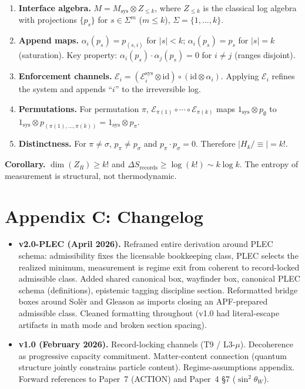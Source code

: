 \documentclass[11pt]{article}
\begin{document}
\begin{enumerate}[leftmargin=1.6em]
    \item \textbf{Interface algebra.} $M = M_{\mathrm{sys}} \otimes Z_{\le k}$,
    where $Z_{\le k}$ is the classical log algebra with projections $\{p_s\}$ for
    $s \in \Sigma^m$ ($m \le k$), $\Sigma = \{1,\ldots,k\}$.
    \item \textbf{Append maps.} $\alpha_i(p_s) = p_{(s,i)}$ for $\lvert s\rvert <
    k$; $\alpha_i(p_s) = p_s$ for $\lvert s\rvert = k$ (saturation). Key property:
    $\alpha_i(p_s) \cdot \alpha_j(p_s) = 0$ for $i \neq j$ (ranges disjoint).
    \item \textbf{Enforcement channels.} $\mathcal{E}_i = (\mathcal{E}_i^{\mathrm{sys}}
    \otimes \mathrm{id}) \circ (\mathrm{id} \otimes \alpha_i)$. Applying
    $\mathcal{E}_i$ refines the system and appends ``$i$'' to the irreversible log.
    \item \textbf{Permutations.} For permutation $\pi$,
    $\mathcal{E}_{\pi(1)} \circ \cdots \circ \mathcal{E}_{\pi(k)}$ maps
    $1_{\mathrm{sys}} \otimes p_{\emptyset}$ to
    $1_{\mathrm{sys}} \otimes p_{(\pi(1),\ldots,\pi(k))} = 1_{\mathrm{sys}} \otimes p_{\pi}$.
    \item \textbf{Distinctness.} For $\pi \neq \sigma$, $p_{\pi} \neq p_{\sigma}$
    and $p_{\pi} \cdot p_{\sigma} = 0$. Therefore $\lvert H_k / \equiv \rvert = k!$.
\end{enumerate}

\textbf{Corollary.} $\dim(Z_R) \ge k!$ and $\Delta S_{\mathrm{records}} \ge \log(k!)
\sim k\log k$. The entropy of measurement is structural, not thermodynamic.

\section*{Appendix C: Changelog}

\begin{itemize}[leftmargin=1.5em,nosep]
\item \textbf{v2.0-PLEC (April 2026).} Reframed entire derivation around PLEC schema:
admissibility fixes the licensable bookkeeping class, PLEC selects the realized minimum,
measurement is regime exit from coherent to record-locked admissible class. Added shared
canonical box, wayfinder box, canonical PLEC schema (definitions), epistemic tagging
discipline section. Reformatted bridge boxes around Sol\`er and Gleason as imports
closing an APF-prepared admissible class. Cleaned formatting throughout (v1.0 had
literal-escape artifacts in math mode and broken section spacing).
\item \textbf{v1.0 (February 2026).} Record-locking channels (T9 / L3-$\mu$).
Decoherence as progressive capacity commitment. Matter-content connection
(quantum structure jointly constrains particle content). Regime-assumptions
appendix. Forward references to Paper~7 (ACTION) and Paper~4 \S 7
($\sin^2\theta_W$).
\end{itemize}
\end{document}
